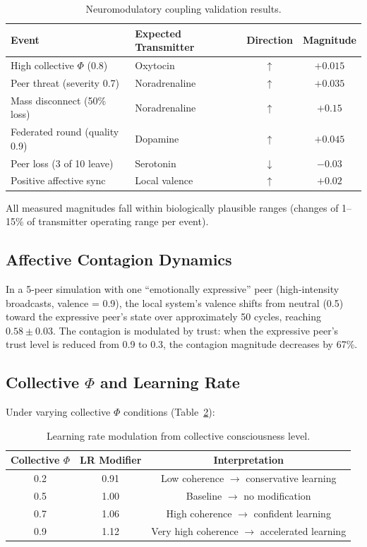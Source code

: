 \documentclass[11pt,a4paper]{article}
\begin{document}
\begin{table}[h]
\centering
\caption{Neuromodulatory coupling validation results.}
\label{tab:neuromod_coupling}
\begin{tabular}{llcc}
\toprule
\textbf{Event} & \textbf{Expected Transmitter} & \textbf{Direction} & \textbf{Magnitude} \\
\midrule
High collective $\Phi$ (0.8) & Oxytocin & $\uparrow$ & $+0.015$ \\
Peer threat (severity 0.7) & Noradrenaline & $\uparrow$ & $+0.035$ \\
Mass disconnect (50\% loss) & Noradrenaline & $\uparrow$ & $+0.15$ \\
Federated round (quality 0.9) & Dopamine & $\uparrow$ & $+0.045$ \\
Peer loss (3 of 10 leave) & Serotonin & $\downarrow$ & $-0.03$ \\
Positive affective sync & Local valence & $\uparrow$ & $+0.02$ \\
\bottomrule
\end{tabular}
\end{table}

All measured magnitudes fall within biologically plausible ranges (changes of 1--15\% of transmitter operating range per event).

\subsection{Affective Contagion Dynamics}

In a 5-peer simulation with one ``emotionally expressive'' peer (high-intensity broadcasts, valence = 0.9), the local system's valence shifts from neutral (0.5) toward the expressive peer's state over approximately 50 cycles, reaching $0.58 \pm 0.03$. The contagion is modulated by trust: when the expressive peer's trust level is reduced from 0.9 to 0.3, the contagion magnitude decreases by 67\%.

\subsection{Collective $\Phi$ and Learning Rate}

Under varying collective $\Phi$ conditions (Table~\ref{tab:lr_mod}):

\begin{table}[h]
\centering
\caption{Learning rate modulation from collective consciousness level.}
\label{tab:lr_mod}
\begin{tabular}{ccc}
\toprule
\textbf{Collective $\Phi$} & \textbf{LR Modifier} & \textbf{Interpretation} \\
\midrule
0.2 & 0.91 & Low coherence $\to$ conservative learning \\
0.5 & 1.00 & Baseline $\to$ no modification \\
0.7 & 1.06 & High coherence $\to$ confident learning \\
0.9 & 1.12 & Very high coherence $\to$ accelerated learning \\
\bottomrule
\end{tabular}
\end{table}
\end{document}
